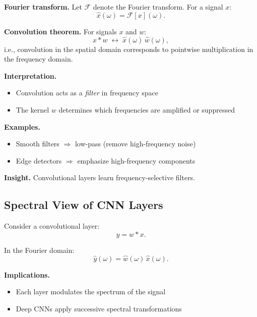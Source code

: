 \noindent
\textbf{Fourier transform.}  
Let $\mathcal{F}$ denote the Fourier transform. For a signal $x$:
\[
\hat{x}(\omega) = \mathcal{F}[x](\omega).
\]

\medskip

\noindent
\textbf{Convolution theorem.}  
For signals $x$ and $w$:
\[
x * w \;\longleftrightarrow\; \hat{x}(\omega)\,\hat{w}(\omega),
\]
i.e., convolution in the spatial domain corresponds to pointwise multiplication in the frequency domain.

\medskip

\noindent
\textbf{Interpretation.}

\begin{itemize}
    \item Convolution acts as a \emph{filter} in frequency space
    \item The kernel $w$ determines which frequencies are amplified or suppressed
\end{itemize}

\medskip

\noindent
\textbf{Examples.}

\begin{itemize}
    \item Smooth filters $\Rightarrow$ low-pass (remove high-frequency noise)
    \item Edge detectors $\Rightarrow$ emphasize high-frequency components
\end{itemize}

\medskip

\noindent
\textbf{Insight.}  
Convolutional layers learn frequency-selective filters.

\subsection{Spectral View of CNN Layers}

Consider a convolutional layer:
\[
y = w * x.
\]

\medskip

\noindent
In the Fourier domain:
\[
\hat{y}(\omega) = \hat{w}(\omega)\,\hat{x}(\omega).
\]

\medskip

\noindent
\textbf{Implications.}

\begin{itemize}
    \item Each layer modulates the spectrum of the signal
    \item Deep CNNs apply successive spectral transformations
\end{itemize}

